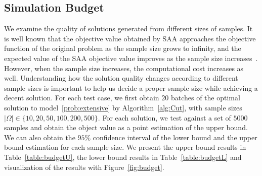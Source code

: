 \documentclass[11pt]{article}
\begin{document}
	\subsection{Simulation Budget} \label{subsec:budget}
	We examine the quality of solutions generated from different sizes of samples. It is well known that the objective value obtained by SAA approaches the objective function of the original problem as the sample size grows to infinity, and the expected value of the SAA objective value improves as the sample size increases~\citep{shapiro2009lectures}. However, when the sample size increases, the computational cost increases as well. Understanding how the solution quality changes according to different sample sizes is important to help us decide a proper sample size while achieving a decent solution. For each test case, we first obtain \(20\) batches of the optimal solution to model~\ref{prob:extensive} by Algorithm~\ref{alg:Cut}, with sample sizes \(|\Omega| \in \{10, 20, 50, 100, 200, 500\}\). For each solution, we test against a set of \(5000\) samples and obtain the object value as a point estimation of the upper bound. We can also obtain the \(95\%\) confidence interval of the lower bound and the upper bound estimation for each sample size. We present the upper bound results in Table~\ref{table:budgetU}, the lower bound results in Table~\ref{table:budgetL} and visualization of the results with Figure~\ref{fig:budget}.
	
	\begin{table}[H]
		\caption{Upper bound confidence interval for solutions generated by different budgets}
		\label{table:budgetU}
	\end{table}
	
\end{document}
